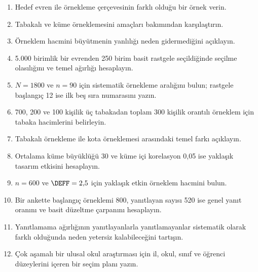 \begin{enumerate}
  \item Hedef evren ile örnekleme çerçevesinin farklı olduğu bir örnek verin.
  \item Tabakalı ve küme örneklemesini amaçları bakımından karşılaştırın.
  \item Örneklem hacmini büyütmenin yanlılığı neden gidermediğini açıklayın.
  \item 5.000 birimlik bir evrenden 250 birim basit rastgele seçildiğinde
  seçilme olasılığını ve temel ağırlığı hesaplayın.
  \item $N=1800$ ve $n=90$ için sistematik örnekleme aralığını bulun; rastgele
  başlangıç 12 ise ilk beş sıra numarasını yazın.
  \item 700, 200 ve 100 kişilik üç tabakadan toplam 300 kişilik orantılı
  örneklem için tabaka hacimlerini belirleyin.
  \item Tabakalı örnekleme ile kota örneklemesi arasındaki temel farkı açıklayın.
  \item Ortalama küme büyüklüğü 30 ve küme içi korelasyon 0,05 ise yaklaşık
  tasarım etkisini hesaplayın.
  \item $n=600$ ve $\DEFF=2{,}5$ için yaklaşık etkin örneklem hacmini bulun.
  \item Bir ankette başlangıç örneklemi 800, yanıtlayan sayısı 520 ise genel
  yanıt oranını ve basit düzeltme çarpanını hesaplayın.
  \item Yanıtlamama ağırlığının yanıtlayanlarla yanıtlamayanlar sistematik
  olarak farklı olduğunda neden yetersiz kalabileceğini tartışın.
  \item Çok aşamalı bir ulusal okul araştırması için il, okul, sınıf ve öğrenci
  düzeylerini içeren bir seçim planı yazın.
\end{enumerate}